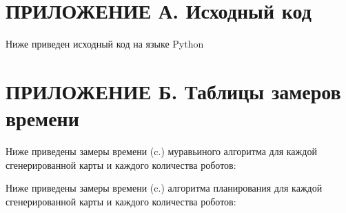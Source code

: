 \documentclass{article}
\numberwithin{equation}{section}
\begin{document}
    \newpage
	\section*{ПРИЛОЖЕНИЕ А. Исходный код} \label{sec:code}
	Ниже приведен исходный код на языке Python
	
	
	
	
	


    \newpage
	\section*{ПРИЛОЖЕНИЕ Б. Таблицы замеров времени} \label{sec:time}
	Ниже приведены замеры времени (c.) муравьиного алгоритма для каждой сгенерированной карты и каждого количества роботов:

	
	
	
	
	
	

	Ниже приведены замеры времени (c.) алгоритма планирования для каждой сгенерированной карты и каждого количества роботов:

	
	
	
	
	
	

    \newpage
\end{document}
